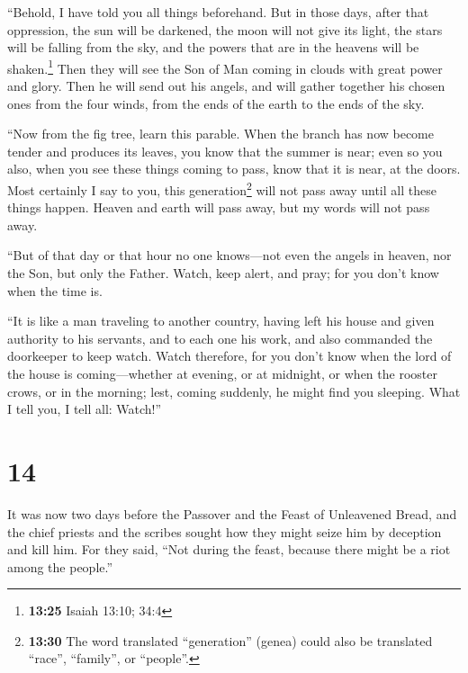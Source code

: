 ``Behold, I have told you all things beforehand.  But in
those days, after that oppression, the sun will be darkened, the moon
will not give its light,  the stars will be falling from
the sky, and the powers that are in the heavens will be
shaken.\footnote{\textbf{13:25} Isaiah 13:10; 34:4}  Then
they will see the Son of Man coming in clouds with great power and
glory.  Then he will send out his angels, and will gather
together his chosen ones from the four winds, from the ends of the earth
to the ends of the sky.

 ``Now from the fig tree, learn this parable. When the
branch has now become tender and produces its leaves, you know that the
summer is near;  even so you also, when you see these
things coming to pass, know that it is near, at the doors.
 Most certainly I say to you, this generation\footnote{\textbf{13:30}
  The word translated ``generation'' (genea) could also be translated
  ``race'', ``family'', or ``people''.} will not pass away until all
these things happen.  Heaven and earth will pass away,
but my words will not pass away.

 ``But of that day or that hour no one knows---not even
the angels in heaven, nor the Son, but only the Father. 
Watch, keep alert, and pray; for you don't know when the time is.

 ``It is like a man traveling to another country, having
left his house and given authority to his servants, and to each one his
work, and also commanded the doorkeeper to keep watch. 
Watch therefore, for you don't know when the lord of the house is
coming---whether at evening, or at midnight, or when the rooster crows,
or in the morning;  lest, coming suddenly, he might find
you sleeping.  What I tell you, I tell all: Watch!''

\hypertarget{section-13}{%
\section{14}\label{section-13}}

 It was now two days before the Passover and the Feast of
Unleavened Bread, and the chief priests and the scribes sought how they
might seize him by deception and kill him.  For they said,
``Not during the feast, because there might be a riot among the
people.''

